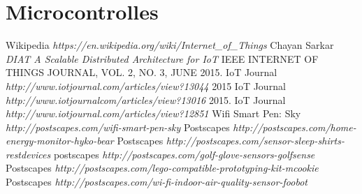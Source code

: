 \documentclass[12pt]{article}
\begin{document}
\section {Microcontrolles}
 
 
 \begin{thebibliography}{1}
  Wikipedia \emph{https://en.wikipedia.org/wiki/Internet_of_Things}
  Chayan Sarkar \emph{DIAT A Scalable Distributed Architecture for IoT} IEEE INTERNET OF THINGS JOURNAL, VOL. 2, NO. 3, JUNE 2015.
  IoT Journal \emph{http://www.iotjournal.com/articles/view?13044} 2015
  IoT Journal \emph {http://www.iotjournalcom/articles/view?13016} 2015.
  IoT Journal \emph{http://www.iotjournal.com/articles/view?12851} 
  Wifi Smart Pen: Sky \emph{http://postscapes.com/wifi-smart-pen-sky} 
  Postscapes \emph{http://postscapes.com/home-energy-monitor-hyko-bear}
  Postscapes \emph{http://postscapes.com/sensor-sleep-shirts-restdevices}
  postscapes \emph {http://postscapes.com/golf-glove-sensors-golfsense}
  Postscapes \emph {http://postscapes.com/lego-compatible-prototyping-kit-mcookie}
  Postscapes \emph{http://postscapes.com/wi-fi-indoor-air-quality-sensor-foobot}

 \end{thebibliography}
\end{document}
